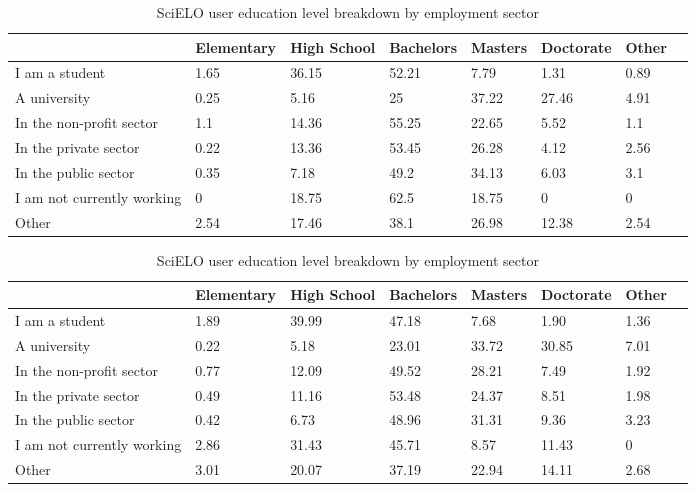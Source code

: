 \begin{table}
\centering
\caption{RedALyC user education level breakdown by employment sector} \label{demographic_work_education_pivot_redalyc}
\begin{tabular}{@{}llllllll@{}}
\toprule
    &   Elementary  &   High School &   Bachelors   &   Masters &   Doctorate   &   Other \\ \midrule
I am a student  &   1.65    &   36.15   &   52.21   &   7.79    &   1.31    &   0.89    \\
A university    &   0.25    &   5.16    &   25  &   37.22   &   27.46   &   4.91    \\
In the non-profit sector    &   1.1 &   14.36   &   55.25   &   22.65   &   5.52    &   1.1 \\
In the private sector   &   0.22    &   13.36   &   53.45   &   26.28   &   4.12    &   2.56    \\
In the public sector    &   0.35    &   7.18    &   49.2    &   34.13   &   6.03    &   3.1 \\
I am not currently working  &   0   &   18.75   &   62.5    &   18.75   &   0   &   0   \\
Other   &   2.54    &   17.46   &   38.1    &   26.98   &   12.38   &   2.54    \\ \bottomrule
\end{tabular}

\vspace{2\baselineskip}

\caption{SciELO user education level breakdown by employment sector} \label{demographic_work_education_pivot_scielo}
\begin{tabular}{@{}llllllll@{}}
\toprule
    &   Elementary  &   High School &   Bachelors   &   Masters &   Doctorate   &   Other \\ \midrule
I am a student  &   1.89    &   39.99   &   47.18   &   7.68    &   1.90    &   1.36    \\
A university    &   0.22    &   5.18    &   23.01   &   33.72   &   30.85   &   7.01    \\
In the non-profit sector    &   0.77    &   12.09   &   49.52   &   28.21   &   7.49    &   1.92    \\
In the private sector   &   0.49    &   11.16   &   53.48   &   24.37   &   8.51    &   1.98    \\
In the public sector    &   0.42    &   6.73    &   48.96   &   31.31   &   9.36    &   3.23    \\
I am not currently working  &   2.86    &   31.43   &   45.71   &   8.57    &   11.43   &   0   \\
Other   &   3.01    &   20.07   &   37.19   &   22.94   &   14.11   &   2.68    \\ \bottomrule
\end{tabular}
\end{table}



